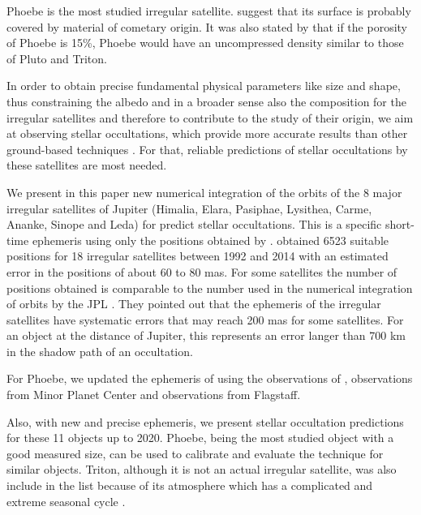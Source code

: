 \documentclass[useAMS,usenatbib]{mn2e}
\begin{document}
Phoebe is the most studied irregular satellite. \cite{Clark2005} suggest that its surface is probably covered by material of cometary origin. It was also stated by \cite{Johnson2005} that if the porosity of Phoebe is 15\%, Phoebe would have an uncompressed density similar to those of Pluto and Triton.

In order to obtain precise fundamental physical parameters like size and shape, thus constraining the albedo and in a broader sense also the composition for the irregular satellites and therefore to contribute to the study of their origin, we aim at observing stellar occultations, which provide  more accurate results than other ground-based techniques \citep{Sicardy2011, Ortiz2012, Braga-Ribas2014}. For that, reliable predictions of stellar occultations by these satellites are most needed.

We present in this paper new numerical integration of the orbits of the 8 major irregular satellites of Jupiter (Himalia, Elara, Pasiphae, Lysithea, Carme, Ananke, Sinope and Leda) for predict stellar occultations. This is a specific short-time ephemeris using only the positions obtained by \cite{GomesJunior2015}. \cite{GomesJunior2015} obtained 6523 suitable positions for 18 irregular satellites between 1992 and 2014 with an estimated error in the positions of about 60 to 80 mas. For some satellites the number of positions obtained is comparable to the number used in the numerical integration of orbits by the JPL \citep{Jacobson2012}. They pointed out that the ephemeris of the irregular satellites have systematic errors that may reach 200 mas for some satellites. For an object at the distance of Jupiter, this represents an error langer than 700 km in the shadow path of an occultation.

For Phoebe, we updated the ephemeris of \cite{Desmars2013} using the observations of \cite{GomesJunior2015}, observations from Minor Planet Center and observations from Flagstaff. %

Also, with new and precise ephemeris, we present stellar occultation predictions for these 11 objects up to 2020. Phoebe, being the most studied object with a good measured size, can be used to calibrate and evaluate the technique for similar objects. Triton, although it is not an actual irregular satellite, was also include in the list because of its atmosphere which has a complicated and extreme seasonal cycle \citep{McKinnon2007, Elliot_2000}.
 
\end{document}
